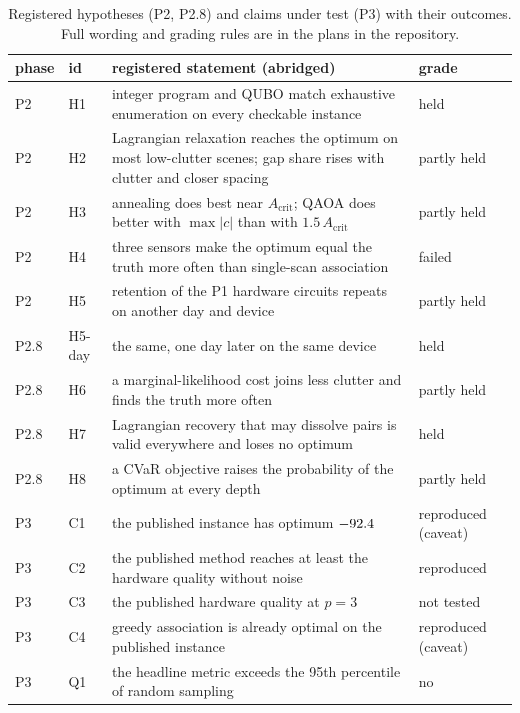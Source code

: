 \documentclass[11pt,a4paper]{article}
\begin{document}
\begin{table}[h]
\centering\small
\begin{tabular}{llp{7cm}l}
\toprule
phase & id & registered statement (abridged) & grade \\
\midrule
P2 & H1 & integer program and QUBO match exhaustive enumeration on every checkable instance & held \\
P2 & H2 & Lagrangian relaxation reaches the optimum on most low-clutter scenes; gap share rises with clutter and closer spacing & partly held \\
P2 & H3 & annealing does best near $A_\mathrm{crit}$; QAOA does better with $\max|c|$ than with $1.5\,A_\mathrm{crit}$ & partly held \\
P2 & H4 & three sensors make the optimum equal the truth more often than single-scan association & failed \\
P2 & H5 & retention of the P1 hardware circuits repeats on another day and device & partly held \\
\midrule
P2.8 & H5-day & the same, one day later on the same device & held \\
P2.8 & H6 & a marginal-likelihood cost joins less clutter and finds the truth more often & partly held \\
P2.8 & H7 & Lagrangian recovery that may dissolve pairs is valid everywhere and loses no optimum & held \\
P2.8 & H8 & a CVaR objective raises the probability of the optimum at every depth & partly held \\
\midrule
P3 & C1 & the published instance has optimum $-92.4$ & reproduced (caveat) \\
P3 & C2 & the published method reaches at least the hardware quality without noise & reproduced \\
P3 & C3 & the published hardware quality at $p=3$ & not tested \\
P3 & C4 & greedy association is already optimal on the published instance & reproduced (caveat) \\
P3 & Q1 & the headline metric exceeds the 95th percentile of random sampling & no \\
\bottomrule
\end{tabular}
\caption{Registered hypotheses (P2, P2.8) and claims under test (P3) with their outcomes. Full wording and grading rules are in the
plans in the repository.}\label{tab:hypotheses}
\end{table}
\end{document}
